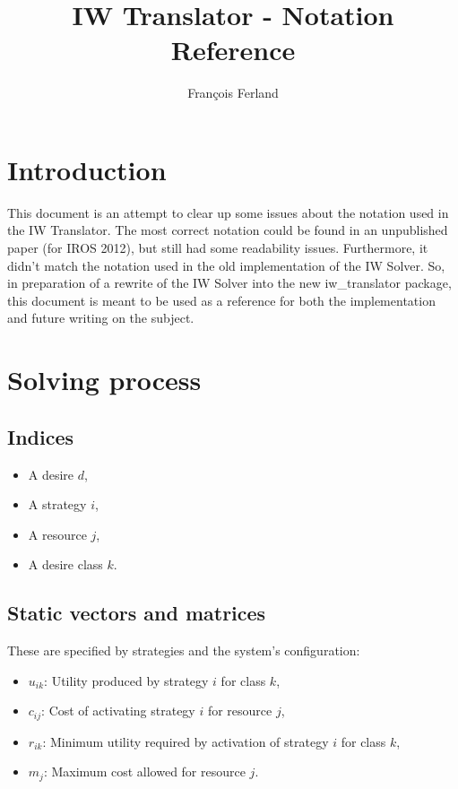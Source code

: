 \documentclass[12pt]{article}
\begin{document}
\author{François Ferland}
\title{IW Translator - Notation Reference}

\maketitle

\section*{Introduction}

This document is an attempt to clear up some issues about the notation used in the IW Translator.
The most correct notation could be found in an unpublished paper (for IROS 2012), but still had some readability issues.
Furthermore, it didn't match the notation used in the old implementation of the IW Solver.
So, in preparation of a rewrite of the IW Solver into the new iw\_translator package, this document is meant to be used as a reference for both the implementation and future writing on the subject.

\section*{Solving process}

\subsection*{Indices}

\begin{itemize}
	\item A desire $d$,
	\item A strategy $i$,
	\item A resource $j$,
	\item A desire class $k$.
\end{itemize}

\subsection*{Static vectors and matrices}

These are specified by strategies and the system's configuration:

\begin{itemize}
	\item $u_{ik}$: Utility produced by strategy $i$ for class $k$,
	\item $c_{ij}$: Cost of activating strategy $i$ for resource $j$,
	\item $r_{ik}$: Minimum utility required by activation of strategy $i$ for class $k$,
	\item $m_{j}$: Maximum cost allowed for resource $j$.
\end{itemize}
\end{document}
